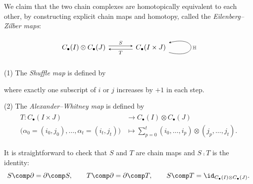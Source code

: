 We
claim that the two chain complexes are homotopically equivalent to each other,
by constructing explicit chain maps and homotopy,
called the \emph{Eilenberg--Zilber maps}:
\begin{equation}\label{eqn:EZMaps}
\begin{tikzcd}[arrow style=tikz,>=stealth,row sep=2.5em,column sep=3.5em]
C_{\bullet}(I)\otimes C_{\bullet}(J)
  \arrow[r, shift left, "S"]
&
C_{\bullet}(I\times J)
  \arrow[l, shift left, "T"]
  \arrow[loop right, <-, "\mathbb{H}"]
\end{tikzcd}
\end{equation}

\begin{defn}\label{defn:EZMaps}
(1)
The \emph{Shuffle map}
is defined by
\begin{center}
\end{center}
where exactly one subscript of $i$ or $j$ increases by $+1$ in each step.

\noindent
(2)
The \emph{Alexander–Whitney map}
is defined by
\begin{align*}
\begin{split}
T:
C_{\bullet}(I\times J)
&\rightarrow
C_{\bullet}(I)\otimes C_{\bullet}(J)
\\[0mm]
\big(\alpha_0=(i_0,j_0),\dots,\alpha_t=(i_t,j_t)\big)
&\mapsto
\sum_{p=0}^t
(i_0,\dots,i_p)\otimes(j_p,\dots,j_t).
\end{split}
\end{align*}

\end{defn}

It is straightforward to check that
$S$ and $T$ are chain maps
and $S\comp T$ is the identity:
$$
S\comp \partial=\partial \comp S,
\qquad
T\comp \partial=\partial \comp T,
\qquad
S\comp T=\id_{C_{\bullet}(I)\otimes C_{\bullet}(J)}.
$$




